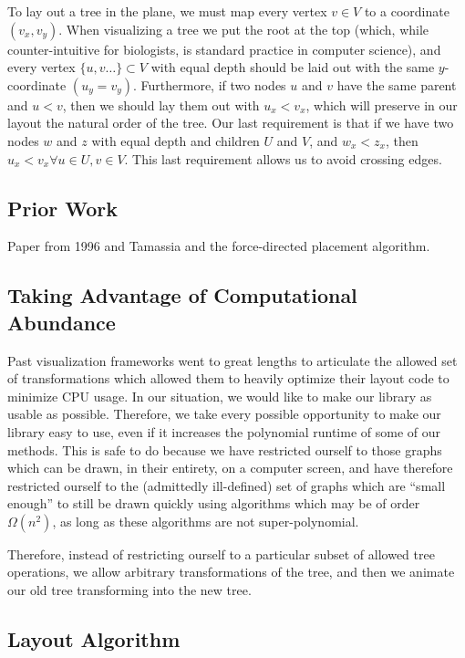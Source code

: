 \documentclass{article}
\begin{document}
To lay out a tree in the plane, we must map every vertex $v \in V$ to a
coordinate $(v_x, v_y)$.  When visualizing a tree we put the root at the top
(which, while counter-intuitive for biologists, is standard practice in
computer science), and every vertex $\{u,v \ldots\} \subset V$ with equal depth
should be laid out with the same $y$-coordinate $(u_y = v_y)$.  Furthermore, if
two nodes $u$ and $v$ have the same parent and $u < v$, then we should lay them
out with $u_x < v_x$, which will preserve in our layout the natural order of the tree.  Our last requirement is that if we have two nodes $w$ and $z$ with equal depth and children $U$ and $V$, and $w_x < z_x$, then $u_x < v_x \forall u\in U, v\in V$.  This last requirement allows us to avoid crossing edges.

\subsection{Prior Work}

Paper from 1996 and Tamassia and the force-directed placement algorithm\cite{fdp}.

\subsection{Taking Advantage of Computational Abundance}

Past visualization frameworks went to great lengths to articulate the allowed
set of transformations which allowed them to heavily optimize their layout code
to minimize CPU usage.  In our situation, we would like to make our library as
usable as possible.  Therefore, we take every possible opportunity to make our
library easy to use, even if it increases the polynomial runtime of some of our
methods.  This is safe to do because we have restricted ourself to those graphs
which can be drawn, in their entirety, on a computer screen, and have therefore
restricted ourself to the (admittedly ill-defined) set of graphs which are
``small enough'' to still be drawn quickly using algorithms which may be of
order $\Omega(n^2)$, as long as these algorithms are not super-polynomial.

Therefore, instead of restricting ourself to a particular subset of allowed
tree operations, we allow arbitrary transformations of the tree, and then we
animate our old tree transforming into the new tree.

\subsection{Layout Algorithm}
\end{document}
